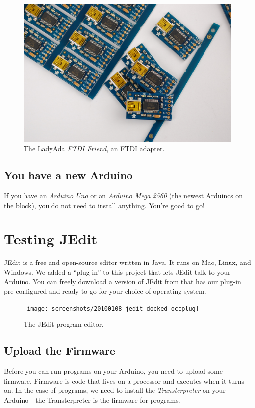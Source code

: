 \begin{figure}[ht]
  \begin{center}
    \includegraphics[width=0.8\linewidth]{images/20110115-ftdi-friend-print}
    \caption{The LadyAda {\em FTDI Friend}, an FTDI adapter.}
    \label{image:ftdi-friend}
  \end{center}
\end{figure}

\subsection{You have a new Arduino}
If you have an {\em Arduino Uno} or an {\em Arduino Mega 2560} (the newest Arduinos on the block), you do not need to install anything. You're good to go!

\section{Testing JEdit}
JEdit is a free and open-source editor written in Java. It runs on Mac, Linux, and Windows. We added a ``plug-in'' to this project that lets JEdit talk to your Arduino. You can freely download a version of JEdit from \ccc that has our plug-in pre-configured and ready to go for your choice of operating system.
      
\begin{figure}[!ht]
  \begin{center}
    \texttt{[image: screenshots/20100108-jedit-docked-occplug]}
    \caption{The JEdit program editor.}
    \label{screenshot:jedit-occplug-docked}
  \end{center}
\end{figure}


\subsection{Upload the Firmware}
Before you can run \occam programs on your Arduino, you need to upload some firmware. {\strong Firmware} is code that lives on a processor and executes when it turns on. In the case of \occam programs, we need to install the {\em Transterpreter} on your Arduino---the Transterpreter is the firmware for \occam programs. 

